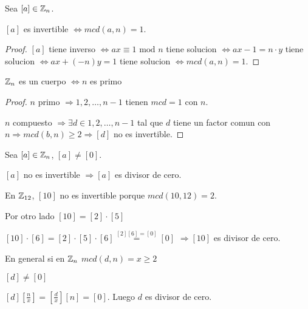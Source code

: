 \begin{proposition}
	Sea \([a] \in \mathbb{Z}_n \).
	
	\([a ]\) es invertible \(\iff mcd(a,n) = 1 \).
\end{proposition}
\begin{proof}
	\([a ]\) tiene inverso \(\iff ax \equiv 1 \text{ mod } n  \) tiene solucion \(\iff ax - 1 = n \cdot y \) tiene solucion \(\iff ax + (-n)y = 1 \) tiene solucion \(\iff mcd(a,n) = 1\).
\end{proof}
\begin{corollary}
	\(\mathbb{Z}_n \) es un cuerpo \(\iff n \) es primo
\end{corollary}
\begin{proof}
	\(n \) primo \(\Rightarrow 1,2,\ldots,n-1\) tienen \(mcd = 1 \) con \(n \).
	
	\(n \) compuesto \(\Rightarrow \exists d \in {1,2,\ldots,n-1}\) tal que \(d \) tiene un factor comun con \(n \Rightarrow mcd(b,n) \geq 2 \Rightarrow [d]\) no es invertible.
\end{proof}
\begin{corollary}
	Sea \([a] \in \mathbb{Z}_n\), \([a] \neq [0]\).
	
	\([a ]\) no es invertible \(\Rightarrow [a ]\) es divisor de cero.
\end{corollary}
\begin{example}
	En \(\mathbb{Z}_{12}\), \([10]\) no es invertible porque \(mcd(10,12) = 2 \).
	
	Por otro lado \([10] = [2] \cdot [5]\)
	
	\([10] \cdot [6] = [2] \cdot [5] \cdot [6] \overset{[2][6]=[0]}{=} [0]\) \(\Rightarrow [10]\) es divisor de cero.
	
	En general si en \(\mathbb{Z}_n\) \(mcd(d,n) = x \geq 2\)
	
	\([d] \neq [0]\)
	
	\([d]\left[\frac{n}{x}\right] = \left[\frac{d}{x}\right] [n] = [0]\). Luego \(d \) es divisor de cero.
\end{example}

